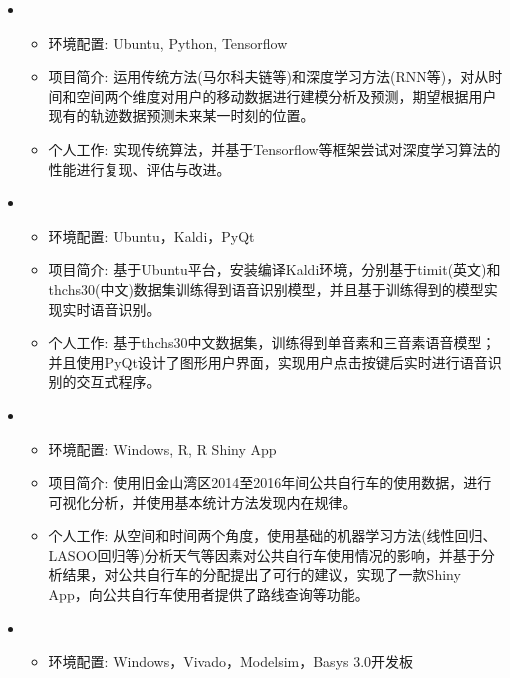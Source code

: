   \begin{itemize}[leftmargin=*]
    \item
      {\small
      \begin{itemize}
        \item 环境配置: Ubuntu, Python, Tensorflow
        \item 项目简介: 运用传统方法(马尔科夫链等)和深度学习方法(RNN等)，对从时间和空间两个维度对用户的移动数据进行建模分析及预测，期望根据用户现有的轨迹数据预测未来某一时刻的位置。
        \item 个人工作: 实现传统算法，并基于Tensorflow等框架尝试对深度学习算法的性能进行复现、评估与改进。 
      \end{itemize}
      }
    \item {}
    {\small
    \begin{itemize}
      \item 环境配置: Ubuntu，Kaldi，PyQt
      \item 项目简介: 基于Ubuntu平台，安装编译Kaldi环境，分别基于timit(英文)和thchs30(中文)数据集训练得到语音识别模型，并且基于训练得到的模型实现实时语音识别。
      \item 个人工作: 基于thchs30中文数据集，训练得到单音素和三音素语音模型；并且使用PyQt设计了图形用户界面，实现用户点击按键后实时进行语音识别的交互式程序。
    \end{itemize}
    }
    \item
      {\small
      \begin{itemize}
        \item 环境配置: Windows, R, R Shiny App
        \item 项目简介: 使用旧金山湾区2014至2016年间公共自行车的使用数据，进行可视化分析，并使用基本统计方法发现内在规律。
        \item 个人工作: 从空间和时间两个角度，使用基础的机器学习方法(线性回归、LASOO回归等)分析天气等因素对公共自行车使用情况的影响，并基于分析结果，对公共自行车的分配提出了可行的建议，实现了一款Shiny App，向公共自行车使用者提供了路线查询等功能。
      \end{itemize}
      }
    \item {}
    {\small
    \begin{itemize}
      \item 环境配置: Windows，Vivado，Modelsim，Basys 3.0开发板

\end{itemize}}
\end{itemize}
